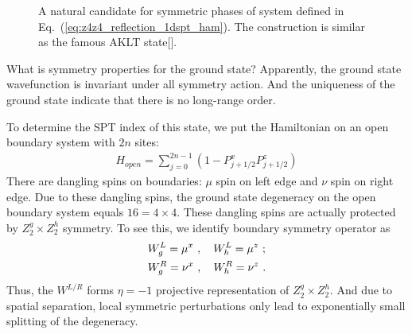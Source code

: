 \documentclass[reprint,amsmath,amssymb,aps,pra,]{revtex4-1}
\begin{document}
\begin{figure}[h]
  \centering
  \caption{A natural candidate for symmetric phases of system defined in Eq.~(\ref{eq:z4z4_reflection_1dspt_ham}). The construction is similar as the famous AKLT state[].}
  \label{fig:1d_z4z4_spt}
\end{figure}

What is symmetry properties for the ground state?
Apparently, the ground state wavefunction is invariant under all symmetry action.
And the uniqueness of the ground state indicate that there is no long-range order.

To determine the SPT index of this state, we put the Hamiltonian on an open boundary system with $2n$ sites:
\begin{align}
  H_{open}=\sum_{j=0}^{2n-1}(1-P^x_{j+1/2}P^z_{j+1/2})
  \label{}
\end{align}
There are dangling spins on boundaries: $\mu$ spin on left edge and $\nu$ spin on right edge.
Due to these dangling spins, the ground state degeneracy on the open boundary system equals $16=4\times 4$.
These dangling spins are actually protected by $Z_2^g\times Z_2^h$ symmetry.
To see this, we identify boundary symmetry operator as
\begin{align}
  &W^L_g=\mu^x~,\quad W^L_h=\mu^z~;\notag\\
  &W^R_g=\nu^x~,\quad W^R_h=\nu^z~.
  \label{}
\end{align}
Thus, the $W^{L/R}$ forms $\eta=-1$ projective representation of $Z_2^g\times Z_2^h$.
And due to spatial separation, local symmetric perturbations only lead to exponentially small splitting of the degeneracy. 
\end{document}
